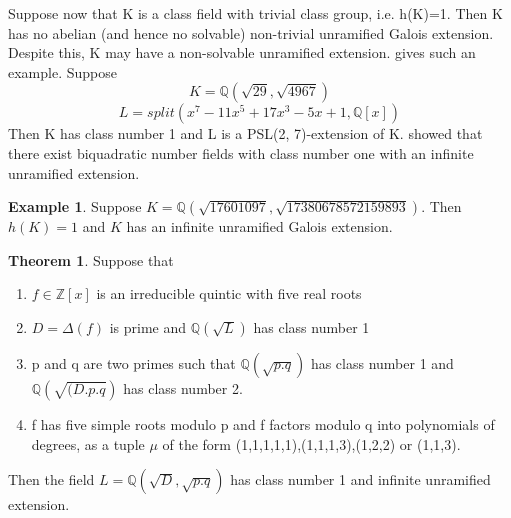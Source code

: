 \documentclass[12pt]{extarticle}
\newcommand{\Q}{\mathbb{Q}}
\newcommand{\<}{\langle}
\renewcommand{\>}{\rangle}
\theoremstyle{definition}
\newtheorem{theorem}{Theorem}
\newtheorem*{example}{Example}
\begin{document}
Suppose now that K is a class field with trivial class group, i.e. h(K)=1. Then K has no abelian (and hence no
solvable) non-trivial unramified Galois extension. Despite this, K may have a non-solvable unramified extension. \cite{BRINK} gives such an example. Suppose
\begin{equation}
   K=\mathbb{Q}(\sqrt{29},\sqrt{4967}) 
\end{equation}
\begin{equation}
   L=split(x^7 - 11x^5 + 17x^3 - 5x + 1,\mathbb{Q}[x])
\end{equation}
Then K has class number 1 and L is a PSL(2, 7)-extension of K.
\cite{MAIR} showed that there exist biquadratic number fields with class number one with an infinite unramified extension. 
\begin{example}
Suppose $K= \Q( \sqrt{17601097}, \sqrt{17380678572159893})$. Then $h(K)=1$ and $K$ has an infinite unramified Galois extension. 
\end{example}
\begin{theorem}
\cite{BRINK} Suppose that \begin{enumerate}
    \item $f\in \mathbb{Z}[x]$ is an irreducible quintic with five real roots
    \item $D=\Delta(f)$ is prime and $\mathbb{Q}(\sqrt{L})$ has class number 1
    \item p and q are two primes such that $\mathbb{Q}(\sqrt{p.q})$ has class number 1 and $\mathbb{Q}(\sqrt{(D.p.q})$ has class number 2.
    \item f has five simple roots modulo p and f factors modulo q into polynomials of degrees, as a tuple $\mu$ of the form (1,1,1,1,1),(1,1,1,3),(1,2,2) or (1,1,3).
\end{enumerate}
Then the field $L=\mathbb{Q}(\sqrt{D},\sqrt{p.q})$ has class number 1 and infinite unramified extension.
\end{theorem}
\end{document}
